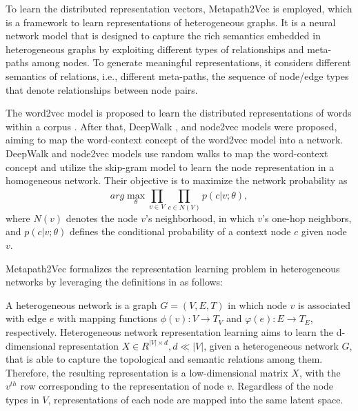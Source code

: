 To learn the distributed representation vectors, Metapath2Vec \cite{dong2017metapath2vec, pal2016deep} is employed, which is a framework to learn representations of heterogeneous graphs. It is a neural network model that is designed to capture the rich semantics embedded in heterogeneous graphs by exploiting different types of relationships and meta-paths among nodes. To generate meaningful representations, it considers different semantics of relations, i.e., different meta-paths, the sequence of node/edge types that denote relationships between node pairs.

The word2vec model is proposed to learn the distributed representations of words within a corpus \cite{mikolov2013efficient, mikolov2013distributed}. After that, DeepWalk \cite{perozzi2014deepwalk}, and node2vec \cite{grover2016node2vec} models were proposed, aiming to map the word-context concept of the word2vec model into a network. DeepWalk and node2vec models use random walks to map the word-context concept and utilize the skip-gram model to learn the node representation in a homogeneous network. Their objective is to maximize the network probability \cite{mikolov2013distributed, perozzi2014deepwalk, grover2016node2vec} as
\begin{equation}
    arg \max_{\theta} \prod_{v \in V}^{} \prod_{c \in N(V)}^{} p(c|v;\theta),
    \label{eq:argmax}
\end{equation}
\noindent where $N(v)$ denotes the node $v$'s neighborhood, in which $v$'s one-hop neighbors, and $p(c|v;\theta)$ defines the conditional probability of a context node $c$ given node $v$.

Metapath2Vec formalizes the representation learning problem in heterogeneous networks by leveraging the definitions in \cite{dong2017metapath2vec, sun2013pathselclus} as follows:

A heterogeneous network is a graph $G = (V, E, T)$ in which node $v$ is associated with edge $e$ with mapping functions $\phi(v) : V \to T_{V}$ and $\varphi(e) : E \to T_{E}$, respectively. Heterogeneous network representation learning aims to learn the d-dimensional representation $X \in R^{|V|\times d}, d \ll |V|$, given a heterogeneous network $G$, that is able to capture the topological and semantic relations among them. Therefore, the resulting representation is a low-dimensional matrix $X$, with the $v^{th}$  row corresponding to the representation of node $v$. Regardless of the node types in $V$, representations of each node are mapped into the same latent space. 

